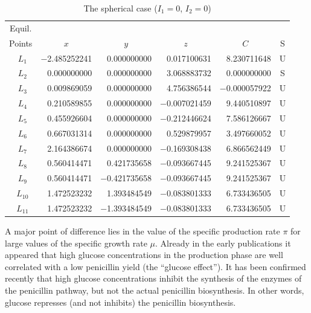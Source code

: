 \documentclass[aoas,preprint]{imsart}
\numberwithin{equation}{section}
\theoremstyle{plain}
\begin{document}
{\begin{table}
\caption{The spherical case ($I_1=0$, $I_2=0$)}
\label{sphericcase}
\begin{tabular}{crrrrc}
\hline
Equil. \\
Points & \multicolumn{1}{c}{$x$} & \multicolumn{1}{c}{$y$} & \multicolumn{1}{c}{$z$} & \multicolumn{1}{c}{$C$} &
S \\
\hline
$~~L_1$ & $-$2.485252241 & 0.000000000 & 0.017100631 & 8.230711648 & U \\
$~~L_2$ &    0.000000000 & 0.000000000 & 3.068883732 & 0.000000000 & S \\
$~~L_3$ &    0.009869059 & 0.000000000 & 4.756386544 & $-$0.000057922 & U \\
$~~L_4$ &    0.210589855 & 0.000000000 & $-$0.007021459 & 9.440510897 & U \\
$~~L_5$ &    0.455926604 & 0.000000000 & $-$0.212446624 & 7.586126667 & U \\
$~~L_6$ &    0.667031314 & 0.000000000 & 0.529879957 & 3.497660052 & U \\
$~~L_7$ &    2.164386674 & 0.000000000 & $-$0.169308438 & 6.866562449 & U \\
$~~L_8$ &    0.560414471 & 0.421735658 & $-$0.093667445 & 9.241525367 & U \\
$~~L_9$ &    0.560414471 & $-$0.421735658 & $-$0.093667445 & 9.241525367 & U
\\
$~~L_{10}$ & 1.472523232 & 1.393484549 & $-$0.083801333 & 6.733436505 & U \\
$~~L_{11}$ & 1.472523232 & $-$1.393484549 & $-$0.083801333 & 6.733436505 & U
\\ \hline
\end{tabular}
\end{table}


A major
point of difference lies in the value of the specific production rate $\pi$ for
large values of the specific growth rate $\mu$.
Already in the early publications \cite{r1,r2,r3}
it appeared that high glucose
concentrations in the production phase are well correlated with a
low penicillin yield (the
``glucose effect''). It has been confirmed recently
\cite{r1,r2,r3,r4}
that
high glucose concentrations inhibit the synthesis of the enzymes of the
penicillin pathway, but not the actual penicillin biosynthesis.
In other words, glucose represses (and not inhibits) the penicillin
biosynthesis.

}
\end{document}
